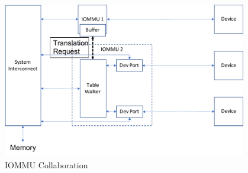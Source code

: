 \begin{figure}[ht!]
    \centering
    \includegraphics[width=0.95\textwidth]{img/collab.pdf}
    \caption{IOMMU Collaboration}
    \label{fig:collab}
\end{figure}



